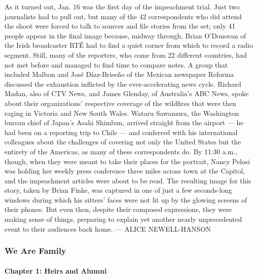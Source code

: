 As it turned out, Jan. 16 was the first day of the impeachment trial.
Just two journalists had to pull out, but many of the 42 correspondents
who did attend the shoot were forced to talk to sources and file stories
from the set; only 41 people appear in the final image because, midway
through, Brian O'Donovan of the Irish broadcaster RTÉ had to find a
quiet corner from which to record a radio segment. Still, many of the
reporters, who come from 22 different countries, had not met before and
managed to find time to compare notes. A group that included Malbon and
José Díaz-Briseño of the Mexican newspaper Reforma discussed the
exhaustion inflicted by the ever-accelerating news cycle. Richard Madan,
also of CTV News, and James Glenday, of Australia's ABC News, spoke
about their organizations' respective coverage of the wildfires that
were then raging in Victoria and New South Wales. Wataru Sawamura, the
Washington bureau chief of Japan's Asahi Shimbun, arrived straight from
the airport --- he had been on a reporting trip to Chile --- and
conferred with his international colleagues about the challenges of
covering not only the United States but the entirety of the Americas, as
many of these correspondents do. By 11:30 a.m., though, when they were
meant to take their places for the portrait, Nancy Pelosi was holding
her weekly press conference three miles across town at the Capitol, and
the impeachment articles were about to be read. The resulting image for
this story, taken by Brian Finke, was captured in one of just a few
seconds-long windows during which his sitters' faces were not lit up by
the glowing screens of their phones. But even then, despite their
composed expressions, they were making sense of things, preparing to
explain yet another nearly unprecedented event to their audiences back
home. --- ALICE NEWELL-HANSON

\hypertarget{we-are-family-1}{%
\subsubsection{We Are Family}\label{we-are-family-1}}

\hypertarget{chapter-1-heirs-and-alumni}{%
\paragraph{Chapter 1: Heirs and
Alumni}\label{chapter-1-heirs-and-alumni}}

\href{/interactive/2020/04/13/t-magazine/black-art-galleries.html}{}

